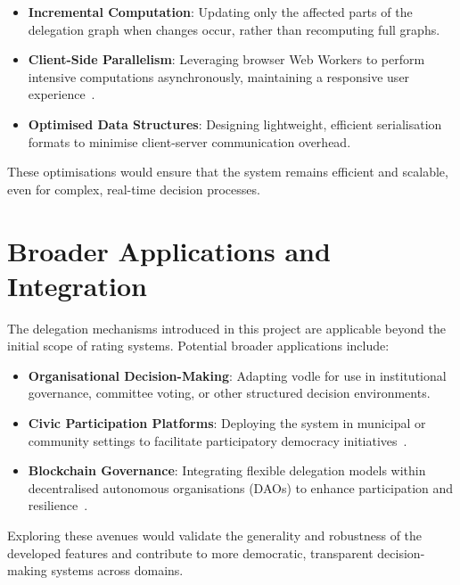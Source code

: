 \begin{itemize}
    \item \textbf{Incremental Computation}: Updating only the affected parts of the delegation graph when changes occur, rather than recomputing full graphs.
    \item \textbf{Client-Side Parallelism}: Leveraging browser Web Workers to perform intensive computations asynchronously, maintaining a responsive user experience~\cite{performanceopt}.
    \item \textbf{Optimised Data Structures}: Designing lightweight, efficient serialisation formats to minimise client-server communication overhead.
\end{itemize}

These optimisations would ensure that the system remains efficient and scalable, even for complex, real-time decision processes.

\section{Broader Applications and Integration}

The delegation mechanisms introduced in this project are applicable beyond the initial scope of rating systems. Potential broader applications include:

\begin{itemize}
    \item \textbf{Organisational Decision-Making}: Adapting vodle for use in institutional governance, committee voting, or other structured decision environments.
    \item \textbf{Civic Participation Platforms}: Deploying the system in municipal or community settings to facilitate participatory democracy initiatives~\cite{civictech}.
    \item \textbf{Blockchain Governance}: Integrating flexible delegation models within decentralised autonomous organisations (DAOs) to enhance participation and resilience~\cite{colony}.
\end{itemize}

Exploring these avenues would validate the generality and robustness of the developed features and contribute to more democratic, transparent decision-making systems across domains.